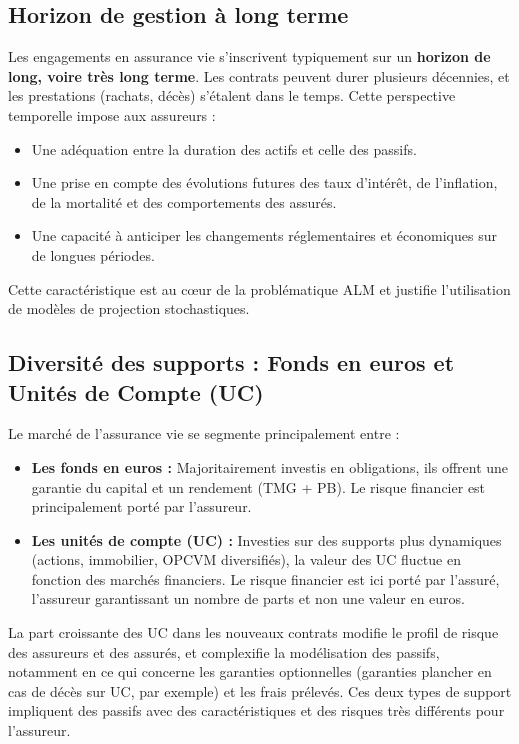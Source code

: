 \subsection{Horizon de gestion à long terme}
\label{subsec:horizon_long_terme}
Les engagements en assurance vie s'inscrivent typiquement sur un \textbf{horizon de long, voire très long terme}. Les contrats peuvent durer plusieurs décennies, et les prestations (rachats, décès) s'étalent dans le temps. Cette perspective temporelle impose aux assureurs :
\begin{itemize}
    \item Une adéquation entre la duration des actifs et celle des passifs.
    \item Une prise en compte des évolutions futures des taux d'intérêt, de l'inflation, de la mortalité et des comportements des assurés.
    \item Une capacité à anticiper les changements réglementaires et économiques sur de longues périodes.
\end{itemize}
Cette caractéristique est au cœur de la problématique ALM et justifie l'utilisation de modèles de projection stochastiques.

\subsection{Diversité des supports : Fonds en euros et Unités de Compte (UC)}
\label{subsec:fonds_euros_uc}
Le marché de l'assurance vie se segmente principalement entre :
\begin{itemize}
    \item \textbf{Les fonds en euros :} Majoritairement investis en obligations, ils offrent une garantie du capital et un rendement (TMG + PB). Le risque financier est principalement porté par l'assureur.
    \item \textbf{Les unités de compte (UC) :} Investies sur des supports plus dynamiques (actions, immobilier, OPCVM diversifiés), la valeur des UC fluctue en fonction des marchés financiers. Le risque financier est ici porté par l'assuré, l'assureur garantissant un nombre de parts et non une valeur en euros.
\end{itemize}
La part croissante des UC dans les nouveaux contrats modifie le profil de risque des assureurs et des assurés, et complexifie la modélisation des passifs, notamment en ce qui concerne les garanties optionnelles (garanties plancher en cas de décès sur UC, par exemple) et les frais prélevés. Ces deux types de support impliquent des passifs avec des caractéristiques et des risques très différents pour l'assureur.

